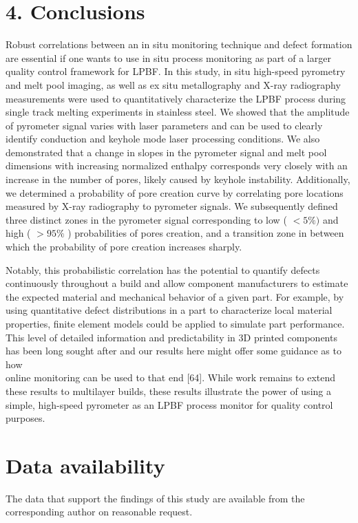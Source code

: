\documentclass[10pt]{article}
\begin{document}
\section*{4. Conclusions}
Robust correlations between an in situ monitoring technique and defect formation are essential if one wants to use in situ process monitoring as part of a larger quality control framework for LPBF. In this study, in situ high-speed pyrometry and melt pool imaging, as well as ex situ metallography and X-ray radiography measurements were used to quantitatively characterize the LPBF process during single track melting experiments in stainless steel. We showed that the amplitude of pyrometer signal varies with laser parameters and can be used to clearly identify conduction and keyhole mode laser processing conditions. We also demonstrated that a change in slopes in the pyrometer signal and melt pool dimensions with increasing normalized enthalpy corresponds very closely with an increase in the number of pores, likely caused by keyhole instability. Additionally, we determined a probability of pore creation curve by correlating pore locations measured by X-ray radiography to pyrometer signals. We subsequently defined three distinct zones in the pyrometer signal corresponding to low ( $<5 \%)$ and high ( $>95 \%$ ) probabilities of pores creation, and a transition zone in between which the probability of pore creation increases sharply.

Notably, this probabilistic correlation has the potential to quantify defects continuously throughout a build and allow component manufacturers to estimate the expected material and mechanical behavior of a given part. For example, by using quantitative defect distributions in a part to characterize local material properties, finite element models could be applied to simulate part performance. This level of detailed information and predictability in 3D printed components has been long sought after and our results here might offer some guidance as to how\\
online monitoring can be used to that end [64]. While work remains to extend these results to multilayer builds, these results illustrate the power of using a simple, high-speed pyrometer as an LPBF process monitor for quality control purposes.

\section*{Data availability}
The data that support the findings of this study are available from the corresponding author on reasonable request.
\end{document}
